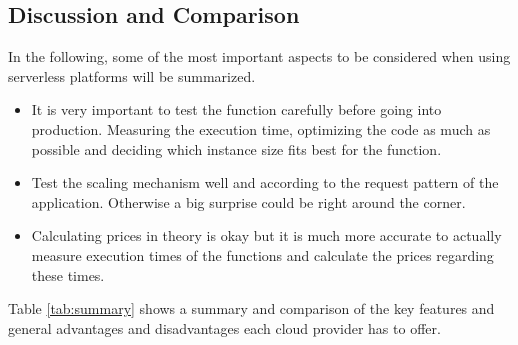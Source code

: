 \subsection*{Discussion and Comparison}
In the following, some of the most important aspects to be considered when using serverless platforms will be summarized.

\begin{itemize}
    \item It is very important to test the function carefully before going into production. Measuring the execution time, optimizing the code as much as possible and deciding which instance size fits best for the function.
    \item Test the scaling mechanism well and according to the request pattern of the application. Otherwise a big surprise could be right around the corner.
    \item Calculating prices in theory is okay but it is much more accurate to actually measure execution times of the functions and calculate the prices regarding these times.
\end{itemize}

Table \ref{tab:summary} shows a summary and comparison of the key features and general advantages and disadvantages each cloud provider has to offer.
